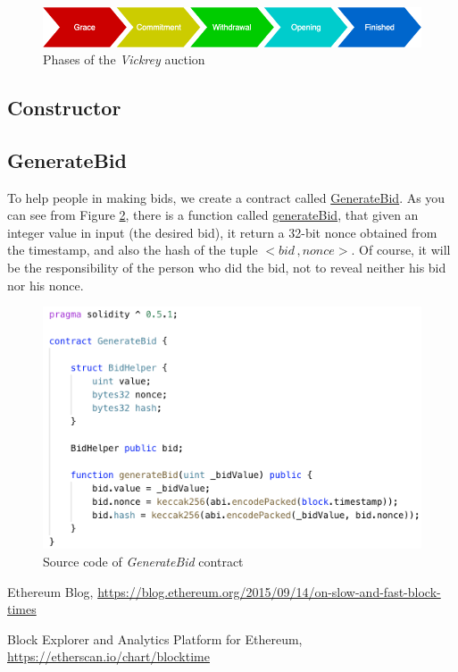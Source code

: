 \documentclass[runningheads,a4paper]{llncs}
\begin{document}
\begin{figure}[h]
\includegraphics[width=0.95\linewidth]{images/vickreyPhases.png}
\centering
\caption{Phases of the \emph{Vickrey} auction}
\label{fig:dutchConstructor}
\end{figure}

\subsection{Constructor}

\newpage
\subsection{GenerateBid}
To help people in making bids, we create a contract called \url{GenerateBid}. As you can see from Figure \ref{fig:GenerateBid}, there is a function called \url{generateBid}, that given an integer value in input (the desired bid), it return a 32-bit nonce obtained from the timestamp, and also the hash of the tuple \(<bid \, , nonce>\). Of course, it will be the responsibility of the person who did the bid, not to reveal neither his bid nor his nonce.

\begin{figure}[h]
\includegraphics[width=0.7\linewidth]{images/generateBid.png}
\centering
\caption{Source code of \emph{GenerateBid} contract}
\label{fig:GenerateBid}
\end{figure}

\newpage
\begin{thebibliography}{4}

 Ethereum Blog, 
\url{https://blog.ethereum.org/2015/09/14/on-slow-and-fast-block-times}

 Block Explorer and Analytics Platform for Ethereum, 
\url{https://etherscan.io/chart/blocktime}

\end{thebibliography}
\end{document}
